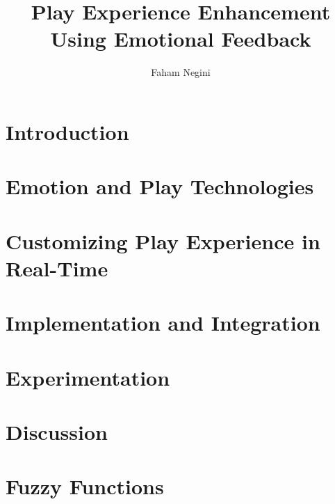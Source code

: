 \documentclass{uofsthesis-cs}
\title{Play Experience Enhancement Using Emotional Feedback}
\author{Faham Negini}
\begin{document}
\maketitle

\frontmatter


\chapter{Introduction}                                
\chapter{Emotion and Play Technologies}               
\chapter{Customizing Play Experience in Real-Time}    
\chapter{Implementation and Integration}              
\chapter{Experimentation}                             
\chapter{Discussion}                                  




\uofsappendix
\chapter{Fuzzy Functions} 

\end{document}
